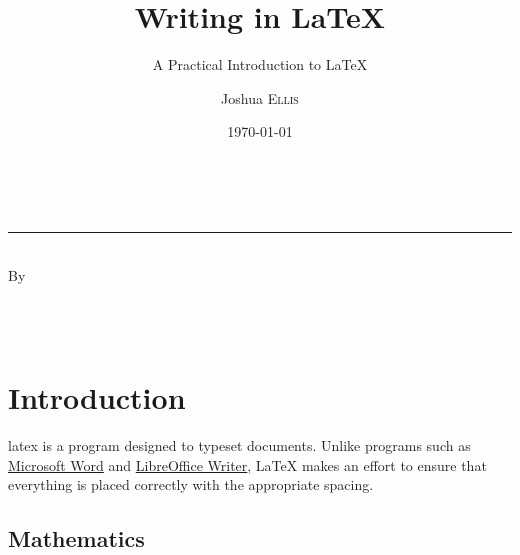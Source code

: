 \documentclass[twoside, onecolumn, portait, bibliography=totoc, parskip=half*]{scrartcl}
\title{Writing in \texorpdfstring{\LaTeX}{LaTeX}}
\subtitle{A Practical Introduction to \texorpdfstring{\LaTeX}{LaTeX}}
\author{Joshua \scshape Ellis}
\date{\today}
\makeatletter
\newcommand{\@degreetitle}{}
\newcommand{\@department}{}
\newcommand{\@university}{}
\makeatother
\begin{document}

\pagestyle{empty}

\begin{titlepage}
  \makeatletter

  \begin{center}
    \vspace*{2.5cm}

    \Huge \textbf{\@title} \\[0em]
    \rule{\linewidth}{2pt}
    \huge \textsc{\@subtitle}\\[6em]

    \large By \\[1cm]
    \huge \@author \\[0.5ex]
    \Large \normalfont \@degreetitle

    \vfill

    \Large \@department \\[1ex]
    \Large \@university

    \vfill

    \large \@date
  \end{center}

\cleardoublepage
\makeatother
\end{titlepage}


\pagestyle{plain}

\tableofcontents

\cleardoublepage
\pagestyle{headings}

\section{Introduction}

\Gls{latex} is a program designed to typeset documents.  Unlike programs such as
\href{http://office.microsoft.com/en-au/word/}{Microsoft Word} and
\href{http://www.libreoffice.org/discover/writer/}{LibreOffice Writer}, LaTeX
makes an effort to ensure that everything is placed correctly with the
appropriate spacing.

\subsection{Mathematics}
\label{subsec:mathematics}
\end{document}
